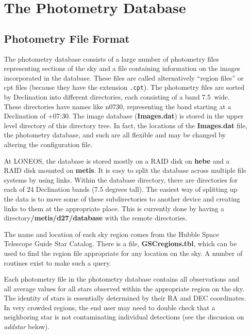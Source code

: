 \documentclass{article}
\newcommand\pr{\em}                   %
\newcommand\ff{\bf}                   %
\newcommand\cc{\tt}                   %
\newcommand\ty{\sc}                   %
\begin{document}
\section{The Photometry Database}

\subsection{Photometry File Format}
The photometry database consists of a large number of photometry files
representing sections of the sky and a file containing information on
the images incorporated in the database.  These files are called
alternatively ``region files'' or {\ty cpt} files (because they have
the extension {\cc .cpt}).  The photometry files are sorted by
Declination into different directories, each consisting of a band
7.5\degree\ wide.  These directories have names like n0730,
representing the band starting at a Declination of +07:30.  The image
database ({\ff Images.dat}) is stored in the upper level directory of
this directory tree.  In fact, the locations of the {\ff Images.dat}
file, the photometry database, and such are all flexible and may be
changed by altering the configuration file.  

At LONEOS, the database is stored mostly on a RAID disk on {\ff hebe}
and a RAID disk mounted on {\ff metis}.  It is easy to split the
database across multiple file systems by using links.  Within the
database directory, there are directories for each of 24 Declination
bands (7.5 degrees tall).  The easiest way of splitting up the data is
to move some of these subdirectories to another device and creating
links to them at the appropriate place.  This is currently done by
having a directory{\ff /metis/d27/database} with the remote
directories.

The name and location of each sky region comes from the Hubble Space
Telescope Guide Star Catalog.  There is a file, {\ff GSCregions.tbl},
which can be used to find the region file appropriate for any location
on the sky.  A number of routines exist to make such a query.

Each photometry file in the photometry database contains all
observations and all average values for all stars observed within the
appropriate region on the sky.  The identity of stars is essentially
determined by their RA and DEC coordinates.  In very crowded regions,
the end user may need to double check that a neighboring star is not
contaminating individual detections (see the discusion on {\pr
addstar} below).
\end{document}

